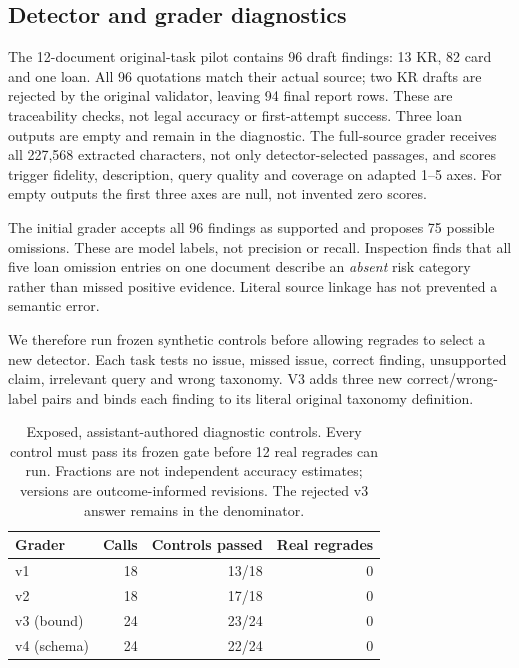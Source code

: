 \documentclass[11pt]{article}
\begin{document}
\subsection{Detector and grader diagnostics}
The 12-document original-task pilot contains 96 draft findings: 13 KR,
82 card and one loan. All 96 quotations match their actual source;
two KR drafts are rejected by the original validator, leaving 94 final
report rows. These are traceability checks, not legal accuracy or
first-attempt success. Three loan outputs are empty and remain in the
diagnostic. The full-source grader receives all 227,568 extracted
characters, not only detector-selected passages, and scores trigger
fidelity, description, query quality and coverage on adapted 1--5 axes.
For empty outputs the first three axes are null, not invented zero scores.

The initial grader accepts all 96 findings as supported and proposes 75
possible omissions. These are model labels, not precision or recall.
Inspection finds that all five loan omission entries on one document
describe an \emph{absent} risk category rather than missed positive
evidence. Literal source linkage has not prevented a semantic error.

We therefore run frozen synthetic controls before allowing regrades to
select a new detector. Each task tests no issue, missed issue, correct
finding, unsupported claim, irrelevant query and wrong taxonomy.
V3 adds three new correct/wrong-label pairs and binds each finding to its
literal original taxonomy definition.

\begin{table}[t]
\centering\small\setlength{\tabcolsep}{4pt}
\begin{tabular}{lrrr}
\toprule
Grader & Calls & Controls passed & Real regrades \\
\midrule
v1 & 18 & 13/18 & 0 \\
v2 & 18 & 17/18 & 0 \\
v3 (bound) & 24 & 23/24 & 0 \\
v4 (schema) & 24 & 22/24 & 0 \\
\bottomrule
\end{tabular}
\caption{Exposed, assistant-authored diagnostic controls. Every control
must pass its frozen gate before 12 real regrades can run. Fractions are
not independent accuracy estimates; versions are outcome-informed
revisions. The rejected v3 answer remains in the denominator.}
\label{tab:grader}
\end{table}
\end{document}
